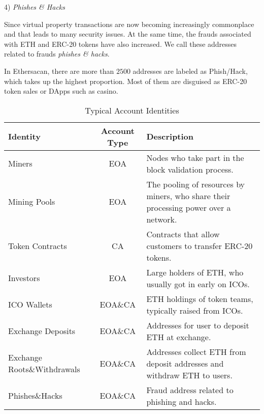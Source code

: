 4) \emph{Phishes \& Hacks}

Since virtual property transactions are now becoming increasingly commonplace and that leads to many security issues. At the same time, the frauds associated with ETH and ERC-20 tokens have also increased. We call these addresses related to frauds \emph{phishes \& hacks}.

 In Ethersacan, there are more than $2500$ addresses are labeled as Phish/Hack, which takes up the highest proportion. Most of them are disguised as ERC-20 token sales or DApps such as casino. 

\begin{table}[htbp]
\caption{Typical Account Identities}
\begin{center}
\begin{tabular}{|p{2.1cm}|c|p{3.9cm}|}
\hline
\textbf{Identity} & \textbf{Account Type}& \textbf{Description} \\
\hline
Miners & EOA & Nodes who take part in the block validation process. \\ \hline
Mining Pools & EOA & The pooling of resources by miners, who share their processing power over a network.\\ \hline
Token Contracts & CA & Contracts that allow customers to transfer ERC-20 tokens. \\ \hline
Investors & EOA & Large holders of ETH, who usually got in early on ICOs. \\ \hline
ICO Wallets & EOA\&CA & ETH holdings of token teams, typically raised from ICOs. \\ \hline
Exchange Deposits & EOA\&CA & Addresses for user to deposit ETH at exchange. \\ \hline
Exchange Roots\&Withdrawals & EOA\&CA & Addresses collect ETH from deposit addresses and withdraw ETH to users. \\ \hline
Phishes\&Hacks & EOA\&CA & Fraud address related to phishing and hacks. \\ \hline
\end{tabular}
\label{tab1}
\end{center}
\end{table}









